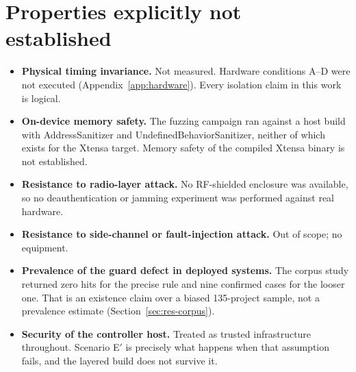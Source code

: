 \section{Properties explicitly not established}

\begin{itemize}[leftmargin=1.6em,itemsep=4pt]
  \item \textbf{Physical timing invariance.} Not measured. Hardware conditions A--D were not
        executed (Appendix~\ref{app:hardware}). Every isolation claim in this work is logical.
  \item \textbf{On-device memory safety.} The fuzzing campaign ran against a host build with
        AddressSanitizer and UndefinedBehaviorSanitizer, neither of which exists for the Xtensa
        target. Memory safety of the compiled Xtensa binary is not established.
  \item \textbf{Resistance to radio-layer attack.} No RF-shielded enclosure was available, so no
        deauthentication or jamming experiment was performed against real hardware.
  \item \textbf{Resistance to side-channel or fault-injection attack.} Out of scope; no
        equipment.
  \item \textbf{Prevalence of the guard defect in deployed systems.} The corpus study returned
        zero hits for the precise rule and nine confirmed cases for the looser one. That is an
        existence claim over a biased 135-project sample, not a prevalence estimate
        (Section~\ref{sec:res-corpus}).
  \item \textbf{Security of the controller host.} Treated as trusted infrastructure throughout.
        Scenario E$'$ is precisely what happens when that assumption fails, and the layered build
        does not survive it.
\end{itemize}
